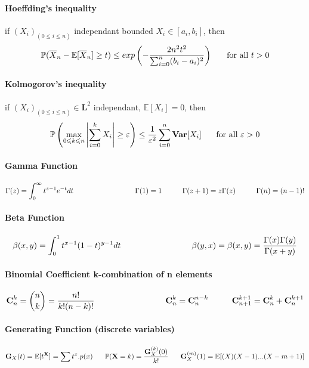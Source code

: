 \documentclass[a4paper,10pt]{article}
\begin{document}
\paragraph{Hoeffding's inequality}
if $(X_{i})_{(0\leqslant i \leqslant n)}$ independant bounded $X_i \in [a_i,b_i]$, then
\[
\mathbb{P}(\overline{X}_n- \mathbb{E}[\overline{X}_n] \geq t) \leq exp\left(-\frac{2n^2t^2}{\sum_{i=0}^{n} (b_i-a_i)^2}\right) 
\hspace{5mm} \text{ for all } t >0
\]

\paragraph{Kolmogorov's inequality}
if $(X_{i})_{(0\leqslant i \leqslant n)} \in \textbf{L}^2$ independant, $\mathbb{E}[X_i]=0$, then
\[
\mathbb{P}\left( \max_{0\leqslant k \leqslant n}\left| \sum_{i=0}^{k} X_i  \right| 
\geq \varepsilon \right) \leq \frac{1}{\varepsilon^2} \sum_{i=0}^{n} \textbf{Var}[X_i]
\hspace{5mm} \text{ for all } \varepsilon >0
\]

\paragraph{Gamma Function}
\[
\Gamma(z) = \int_{0}^{\infty} t^{z-1}e^{-t}dt 
\hspace{30mm}  \Gamma(1) = 1 
\hspace{10mm}  \Gamma(z+1) = z\Gamma(z) 
\hspace{10mm}  \Gamma(n) = (n-1)! 
\]
\paragraph{Beta Function}
\[
\beta(x,y)=  \int_{0}^{1}  t^{x-1}(1-t)^{y-1}dt  \hspace{30mm} \beta(y,x)=\beta(x,y)= \frac{\Gamma(x)\Gamma(y)}{\Gamma(x+y)}
\]
\paragraph{Binomial Coefficient k-combination of n elements}
\[
\textbf{C}^{k}_{n} = \binom{n}{k} = \frac{n!}{k!(n-k)!}
\hspace{30mm} \textbf{C}^{k}_{n} = \textbf{C}^{n-k}_{n} 
\hspace{10mm} \textbf{C}^{k+1}_{n+1} = \textbf{C}^{k}_{n} + \textbf{C}^{k+1}_{n} 
\]

\paragraph{Generating Function (discrete variables)}
\[
\textbf{G}_{X}(t)= \mathbb{E}[t^{\textbf{X}}] = \sum t^{x}.p(x)
\hspace{6mm} \mathbb{P}(\textbf{X}=k) = \frac{\textbf{G}_{X}^{(k)}(0)}{k!}
\hspace{6mm} \textbf{G}_{X}^{(m)}(1)  = \mathbb{E}[(X)(X-1)...(X-m+1)]
\]
\end{document}
